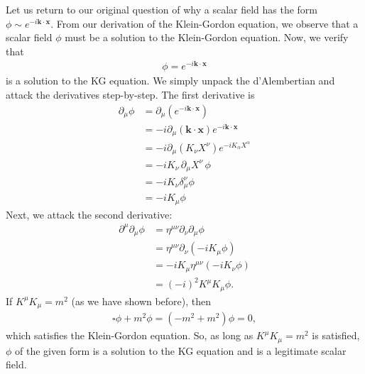 \documentclass[a4paper,11pt]{article}
\numberwithin{equation}{section}
\theoremstyle{definition}
\begin{document}
Let us return to our original question of why a scalar field has the form $\phi  \sim e^{-i\mathbf{k}\cdot\mathbf{x}}$. From our derivation of the Klein-Gordon equation, we observe that a scalar field $\phi$ must be a solution to the Klein-Gordon equation. Now, we verify that
\begin{align*}
\phi = e^{-i\mathbf{k}\cdot\mathbf{x}}
\end{align*}
is a solution to the KG equation. We simply unpack the d'Alembertian and attack the derivatives step-by-step. The first derivative is
\begin{align*}
\partial_\mu \phi &= \partial_\mu \left(e^{-i\mathbf{k}\cdot\mathbf{x}} \right)\\
&= -i\partial_\mu \left( \mathbf{k}\cdot\mathbf{x}\right)e^{-i\mathbf{k}\cdot\mathbf{x}}
\\
&= -i\partial_\mu \left(K_\nu X^\nu\right) e^{-iK_\alpha X^\alpha}\\
&= -iK_\nu\, \partial_\mu X^\nu\,\phi\\
&= -iK_\nu \delta^\nu_\mu \phi\\
&= -iK_\mu \phi 
\end{align*} 
Next, we attack the second derivative:
\begin{align*}
\partial^\mu \partial_\mu \phi &= \eta^{\mu\nu}\partial_\nu\partial_\mu\phi\\
&= \eta^{\mu\nu}\partial_\nu \left( -iK_\mu\phi \right)\\
&= -iK_\mu\eta^{\mu\nu}\left( -iK_\nu\phi \right)\\
&= (-i)^2 K^\mu K_\mu \phi.
\end{align*}
If $K^\mu K_\mu = m^2$ (as we have shown before), then 
\begin{align*}
\square \phi + m^2\phi = (-m^2 + m^2)\phi = 0, 
\end{align*}
which satisfies the Klein-Gordon equation. So, as long as $K^\mu K_\mu = m^2$ is satisfied, $\phi$ of the given form is a solution to the KG equation and is a legitimate scalar field. \\
\end{document}
